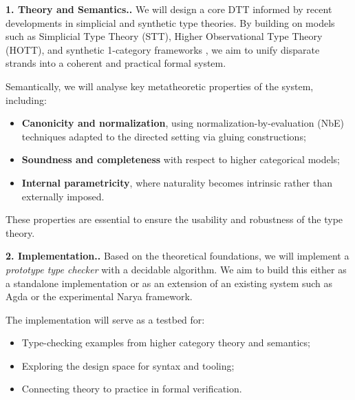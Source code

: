 \documentclass[a4paper,11pt]{article}
\let\oldcite\cite
\renewcommand*\cite[1]{{\protect\NoHyper\oldcite{#1}\protect\endNoHyper}}
\renewcommand{\paragraph}[1]{\textbf{#1.}}
\begin{document}
\paragraph{1. Theory and Semantics.}
We will design a core DTT informed by recent developments in simplicial and synthetic type theories. By building on models such as Simplicial Type Theory (STT), Higher Observational Type Theory (HOTT), and synthetic 1-category frameworks \cite{riehlshulman2017, licata2016, north_2019, altenkirch_neumann_2024}, we aim to unify disparate strands into a coherent and practical formal system.

Semantically, we will analyse key metatheoretic properties of the system, including:
\begin{itemize}
  \item \textbf{Canonicity and normalization}, using normalization-by-evaluation (NbE) techniques adapted to the directed setting via gluing constructions;
  \item \textbf{Soundness and completeness} with respect to higher categorical models;
  \item \textbf{Internal parametricity}, where naturality becomes intrinsic rather than externally imposed.
\end{itemize}
These properties are essential to ensure the usability and robustness of the type theory.

\paragraph{2. Implementation.}
Based on the theoretical foundations, we will implement a \emph{prototype type checker} with a decidable algorithm. We aim to build this either as a standalone implementation or as an extension of an existing system such as \textsf{Agda} or the experimental \textsf{Narya} framework.

The implementation will serve as a testbed for:
\begin{itemize}
  \item Type-checking examples from higher category theory and semantics;
  \item Exploring the design space for syntax and tooling;
  \item Connecting theory to practice in formal verification.
\end{itemize}
\end{document}
